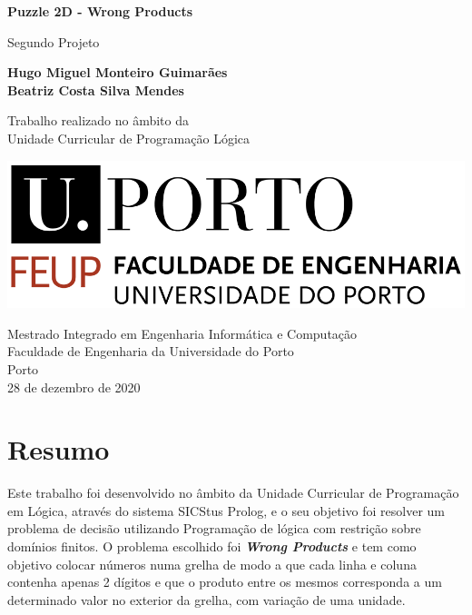 \documentclass[11pt]{article}
\begin{document}
\begin{titlepage}
	\begin{center}
		\vspace*{1cm}
		
		\Large
		\textbf{Puzzle 2D - Wrong Products}
		
		\vspace{0.5cm}
		\large
		Segundo Projeto
		
		\vspace{1.5cm}
		
		\textbf{Hugo Miguel Monteiro Guimarães}\\
		\textbf{Beatriz Costa Silva Mendes}
		
		\vspace{5cm}
		
		Trabalho realizado no âmbito da\\
		Unidade Curricular de Programação Lógica
		
		\vspace{0.8cm}
	
		\includegraphics[width=0.4 \textwidth]{feup_logo.png}
		
		\vspace{1.5cm}		
		
		\large
		Mestrado Integrado em Engenharia Informática e Computação\\
		Faculdade de Engenharia da Universidade do Porto\\
		Porto\\
		28	 de dezembro de 2020
	
	\end{center}
\end{titlepage}


\pagebreak
\tableofcontents

\pagebreak


\section*{Resumo} 
Este trabalho foi desenvolvido no âmbito da Unidade Curricular de Programação em Lógica, através do sistema SICStus Prolog, e o seu objetivo foi resolver um problema de decisão utilizando Programação de lógica com restrição sobre domínios finitos. O problema escolhido foi \textbf{\emph{Wrong Products}} e tem como objetivo colocar números numa grelha de modo a que cada linha e coluna contenha apenas 2 dígitos e que o produto entre os mesmos corresponda a um determinado valor no exterior da grelha, com variação de uma unidade.
\end{document}
